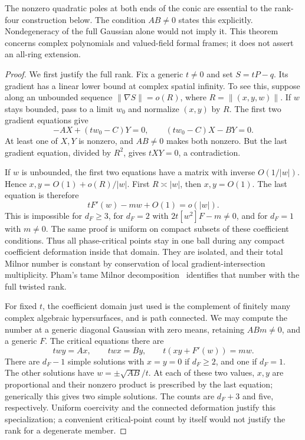 \documentclass[11pt]{article}
\theoremstyle{definition}\newtheorem{definition}[theorem]{Definition}
\theoremstyle{remark}\newtheorem{remark}[theorem]{Remark}
\begin{document}
The nonzero quadratic poles at both ends of the conic are essential
to the rank-four construction below. The condition $AB\ne0$ states
this explicitly. Nondegeneracy of the full Gaussian alone would not
imply it. This theorem concerns complex polynomials and valued-field
formal frames; it does not assert an all-ring extension.

\begin{proof}
We first justify the full rank. Fix a generic $t\ne0$ and set
$S=tP-q$. Its gradient has a linear lower bound at complex spatial
infinity. To see this, suppose along an unbounded sequence
$\|\nabla S\|=o(R)$, where $R=\|(x,y,w)\|$. If $w$ stays
bounded, pass to a limit $w_0$ and normalize $(x,y)$ by $R$.
The first two gradient equations give
\[
 -AX+(tw_0-C)Y=0,\qquad (tw_0-C)X-BY=0.
\]
At least one of $X,Y$ is nonzero, and $AB\ne0$ makes both
nonzero. But the last gradient equation, divided by $R^2$, gives
$tXY=0$, a contradiction.

If $w$ is unbounded, the first two equations have a matrix with
inverse $O(1/|w|)$. Hence
$x,y=O(1)+o(R)/|w|$. First $R\asymp |w|$, then $x,y=O(1)$.
The last equation is therefore
\[
 tF'(w)-mw+O(1)=o(|w|).
\]
This is impossible for $d_F\ge3$, for $d_F=2$ with
$2t[w^2]F-m\ne0$, and for $d_F=1$ with $m\ne0$.
The same proof is uniform on compact subsets of these coefficient
conditions. Thus all phase-critical points stay in one ball during
any compact coefficient deformation inside that domain. They are
isolated, and their total Milnor number is constant by conservation
of local gradient-intersection multiplicity. Pham's tame Milnor
decomposition~\cite[Part~I, Sections~1--4]{Pham} identifies that
number with the full twisted rank.

For fixed $t$, the coefficient domain just used is the complement
of finitely many complex algebraic hypersurfaces, and is path
connected. We may compute the number at a generic diagonal
Gaussian with zero means, retaining $ABm\ne0$, and a generic $F$.
The critical equations there are
\[
 twy=Ax,\qquad twx=By,\qquad t(xy+F'(w))=mw.
\]
There are $d_F-1$ simple solutions with $x=y=0$ if $d_F\ge2$,
and one if $d_F=1$. The other solutions have
$w=\pm\sqrt{AB}/t$. At each of these two values, $x,y$ are
proportional and their nonzero product is prescribed by the last
equation; generically this gives two simple solutions. The counts
are $d_F+3$ and five, respectively. Uniform coercivity and the
connected deformation justify this specialization; a convenient
critical-point count by itself would not justify the rank for a
degenerate member.


\end{proof}
\end{document}
